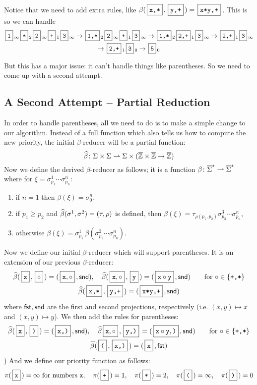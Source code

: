 \documentclass{llncs}
\newcounter{algo}
\begin{document}
Notice that we need to add extra rules, like $\beta(\mbt{x,*},\mbt{y,+})=\mbt{x*y,+}$.
This is so we can handle
\begin{multline*}
    \mbt1_\infty \mbt*_2 \mbt2_\infty \mbt+_1 \mbt3_\infty \to \mbt{1,*}_2 \mbt2_\infty \mbt+_1 \mbt3_\infty \to \mbt{1,*}_2 \mbt{2,+}_1 \mbt3_\infty \to \mbt{2,+}_1 \mbt3_\infty\\
    \to \mbt{2,+}_1 \mbt3_0 \to \mbt5_0
\end{multline*}

But this has a major issue: it can't handle things like parentheses.
So we need to come up with a second attempt.

\subsection{A Second Attempt -- Partial Reduction}

In order to handle parentheses, all we need to do is to make a simple change to our algorithm.
Instead of a full function which also tells us how to compute the new priority, the initial $\beta$-reducer will be a partial function:
\[ \widehat\beta\colon \Sigma\times\Sigma\rightharpoonup\Sigma\times(\overline{\mathbb Z}\times\overline{\mathbb Z}\to\overline{\mathbb Z}) \]
Now we define the derived $\beta$-reducer as follows; it is a function $\beta\colon\overline\Sigma^*\rightharpoonup\overline\Sigma^*$ where for $\xi=\sigma^1_{p_1}\cdots\sigma^n_{p_n}$:
\begin{enumerate}
    \item if $n=1$ then $\beta(\xi)=\sigma^n_0$,
    \item if $p_1\geq p_2$ and $\widehat\beta(\sigma^1,\sigma^2)=(\tau,\rho)$ is defined, then $\beta(\xi)=\tau_{\rho(p_1,p_2)}\sigma^3_{p_3}\cdots\sigma^n_{p_n}$,
    \item otherwise $\beta(\xi)=\sigma^1_{p_1}\,\beta(\sigma^2_{p_2}\cdots\sigma^n_{p_n})$.
\end{enumerate}

Now we define our initial $\beta$-reducer which will support parentheses.
It is an extension of our previous $\beta$-reducer:
\begin{gather*}
    \hb(\mbt x,\mb\circ) = (\mb{\ttt x,\circ},\snd),\quad \hb(\mb{\ttt x,\circ},\mbt y) = (\mb{\ttt x\circ\ttt y},\snd) \qquad \hbox{for $\circ\in\set{\ttt{+,*}}$} \\
    \hb(\mbt{x,*},\mbt{y,+}) = (\mbt{x*y,+},\snd)
\end{gather*}
where $\mathsf{fst},\mathsf{snd}$ are the first and second projections, respectively (i.e. $(x,y)\mapsto x$ and $(x,y)\mapsto y$).
We then add the rules for parentheses:
\begin{gather*}
    \hb(\mbt x,\mbt)) = (\mbt{x,)},\snd),\quad \hb{\mb{\ttt x,\circ},\mbt{y,)}} = (\mb{\ttt x\circ\ttt y,\ttt)},\snd) \qquad \hbox{for $\circ\in\set{\ttt{+,*}}$} \\
    \hb(\mbt(,\mbt{x,)}) = (\mbt x,\fst)
\end{gather*}
\gobble) %
And we define our priority function as follows:
\[ \pi(\mbt x) = \infty\hbox{ for numbers \ttt x},\quad \pi(\mbt+) = 1,\quad \pi(\mbt*) = 2,\quad \pi(\mbt() = \infty,\quad \pi(\mbt)) = 0 \]
\end{document}
